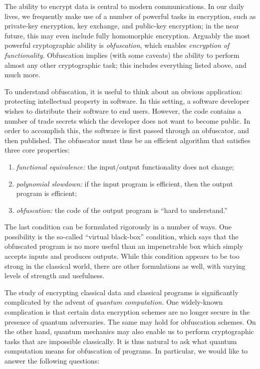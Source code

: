 \documentclass[11pt]{article}
\numberwithin{equation}{section}
\begin{document}
{The ability to encrypt data is central to modern communications. In our daily lives, we frequently make use of a number of powerful tasks in encryption, such as private-key encryption, key exchange, and public-key encryption; in the near future, this may even include fully homomorphic encryption. Arguably the most powerful cryptographic ability is \emph{obfuscation}, which enables \emph{encryption of functionality}. Obfuscation implies (with some caveats) the ability to perform almost any other cryptographic task; this includes everything listed above, and much more. 

To understand obfuscation, it is useful to think about an obvious application: protecting intellectual property in software. In this setting, a software developer wishes to distribute their software to end users. However, the code contains a number of trade secrets which the developer does not want to become public. In order to accomplish this, the software is first passed through an obfuscator, and then published. The obfuscator must thus be an efficient algorithm that satisfies three core properties: 
\begin{enumerate}\label{def:obf-informal}
\item \emph{functional equivalence:} the input/output functionality does not change;
\item \emph{polynomial slowdown:} if the input program is efficient, then the output program is efficient;
\item \emph{obfuscation:} the code of the output program is ``hard to understand.''
\end{enumerate}
The last condition can be formulated rigorously in a number of ways. One possibility is the so-called ``virtual black-box'' condition, which says that the obfuscated program is no more useful than an impenetrable box which simply accepts inputs and produces outputs. While this condition appears to be too strong in the classical world, there are other formulations as well, with varying levels of strength and usefulness.

The study of encrypting classical data and classical programs is significantly complicated by the advent of \emph{quantum computation.} One widely-known complication is that certain data encryption schemes are no longer secure in the presence of quantum adversaries. The same may hold for obfuscation schemes. On the other hand, quantum mechanics may also enable us to perform cryptographic tasks that are impossible classically. It is thus natural to ask what quantum computation means for obfuscation of programs. In particular, we would like to answer the following questions:

}
\end{document}
